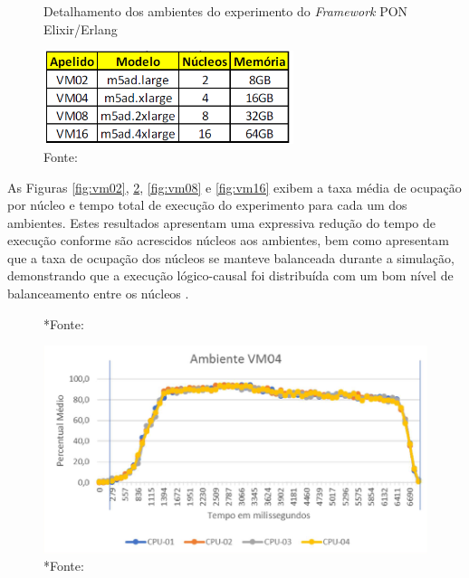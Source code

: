 \begin{figure}[!htb]
  \centering
  \caption{Detalhamento dos ambientes do experimento do \textit{Framework} PON
    Elixir/Erlang} \includegraphics[width=0.65\textwidth]{../figures/maquinas_elixir.png}
  \smallskip
  \caption*{Fonte: }
  \label{fig:ambientes_elixir}
\end{figure}

As Figuras \ref{fig:vm02}, \ref{fig:vm04}, \ref{fig:vm08} e \ref{fig:vm16}
exibem a taxa média de ocupação por núcleo e tempo total de execução do
experimento para cada um dos ambientes. Estes resultados apresentam uma
expressiva redução do tempo de execução conforme são acrescidos núcleos aos
ambientes, bem como apresentam que a taxa de ocupação dos núcleos se manteve
balanceada durante a simulação, demonstrando que a execução lógico-causal foi
distribuída com um bom nível de balanceamento entre os núcleos
\cite{msc_negrini_2019}.

\begin{figure}[!htb]
  \centering
  \begin{minipage}{.5\textwidth}
    \centering
    *{Fonte: }
    \label{fig:vm02}
  \end{minipage}%
  \begin{minipage}{.5\textwidth}
    \centering
    \includegraphics[width=\linewidth]{../figures/vm04.png}
    \smallskip
    *{Fonte: }
    \label{fig:vm04}
  \end{minipage}
\end{figure}

